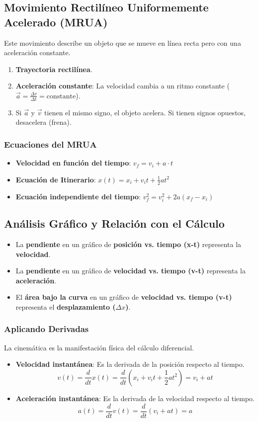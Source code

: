 \documentclass[11pt]{article}
\begin{document}
\subsection{Movimiento Rectilíneo Uniformemente Acelerado (MRUA)}
Este movimiento describe un objeto que se mueve en línea recta pero con una aceleración constante.
\begin{enumerate}
	\item \textbf{Trayectoria rectilínea}.
	\item \textbf{Aceleración constante}: La velocidad cambia a un ritmo constante ($\vec{a} = \frac{\Delta v}{\Delta t} = \text{constante}$).
	\item Si $\vec{a}$ y $\vec{v}$ tienen el mismo signo, el objeto acelera. Si tienen signos opuestos, desacelera (frena).
\end{enumerate}

\subsubsection{Ecuaciones del MRUA}
\begin{itemize}
	\item \textbf{Velocidad en función del tiempo}: $v_f = v_i + a \cdot t$
	\item \textbf{Ecuación de Itinerario}: $x(t) = x_i + v_i t + \frac{1}{2}at^2$
	\item \textbf{Ecuación independiente del tiempo}: $v_f^2 = v_i^2 + 2a(x_f - x_i)$
\end{itemize}

\subsection{Análisis Gráfico y Relación con el Cálculo}
\begin{itemize}
	\item La \textbf{pendiente} en un gráfico de \textbf{posición vs. tiempo (x-t)} representa la \textbf{velocidad}.
	\item La \textbf{pendiente} en un gráfico de \textbf{velocidad vs. tiempo (v-t)} representa la \textbf{aceleración}.
	\item El \textbf{área bajo la curva} en un gráfico de \textbf{velocidad vs. tiempo (v-t)} representa el \textbf{desplazamiento ($\Delta x$)}.
\end{itemize}

\subsubsection{Aplicando Derivadas}
La cinemática es la manifestación física del cálculo diferencial.
\begin{itemize}
	\item \textbf{Velocidad instantánea}: Es la derivada de la posición respecto al tiempo.
	      \[ v(t) = \frac{d}{dt} x(t) = \frac{d}{dt} \left(x_i + v_i t + \frac{1}{2}at^2\right) = v_i + at \]
	\item \textbf{Aceleración instantánea}: Es la derivada de la velocidad respecto al tiempo.
	      \[ a(t) = \frac{d}{dt} v(t) = \frac{d}{dt} (v_i + at) = a \]
\end{itemize}
\end{document}
